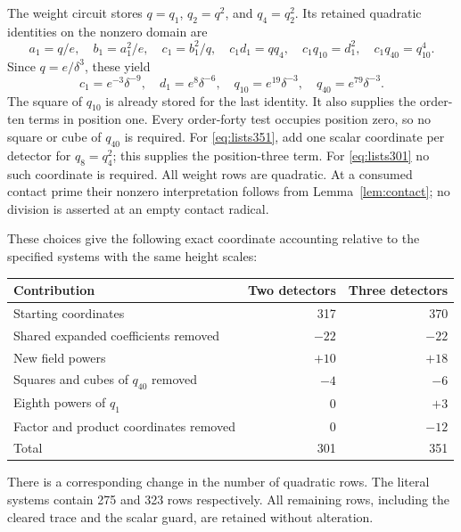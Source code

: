 \documentclass[11pt,a4paper]{article}
\theoremstyle{remark}\newtheorem{remark}[theorem]{Remark}
\begin{document}
The weight circuit stores $q=q_1$, $q_2=q^2$, and $q_4=q_2^2$.
Its retained quadratic identities on the nonzero domain are
\[
 a_1=q/e,\quad b_1=a_1^2/e,\quad c_1=b_1^2/q,\quad
 c_1d_1=qq_4,\quad c_1q_{10}=d_1^2,\quad c_1q_{40}=q_{10}^4.
\]
Since $q=e/\delta^3$, these yield
\[
 c_1=e^{-3}\delta^{-9},\quad d_1=e^8\delta^{-6},\quad
 q_{10}=e^{19}\delta^{-3},\quad q_{40}=e^{79}\delta^{-3}.
\]
The square of $q_{10}$ is already stored for the last identity. It
also supplies the order-ten terms in position one. Every order-forty
test occupies position zero, so no square or cube of $q_{40}$ is
required. For \eqref{eq:lists351}, add one scalar coordinate per
detector for $q_8=q_4^2$; this supplies the position-three term.
For \eqref{eq:lists301} no such coordinate is required. All weight
rows are quadratic. At a consumed contact prime their nonzero
interpretation follows from Lemma~\ref{lem:contact}; no division
is asserted at an empty contact radical.

These choices give the following exact coordinate accounting relative
to the specified systems with the same height scales:
\begin{center}
\begin{tabular}{lrr}
\toprule
Contribution&Two detectors&Three detectors\\\midrule
Starting coordinates&317&370\\
Shared expanded coefficients removed&$-22$&$-22$\\
New field powers&$+10$&$+18$\\
Squares and cubes of $q_{40}$ removed&$-4$&$-6$\\
Eighth powers of $q_1$&$0$&$+3$\\
Factor and product coordinates removed&$0$&$-12$\\\midrule
Total&301&351\\\bottomrule
\end{tabular}
\end{center}
There is a corresponding change in the number of quadratic rows.
The literal systems contain 275 and 323 rows respectively. All
remaining rows, including the cleared trace and the scalar guard,
are retained without alteration.
\end{document}
